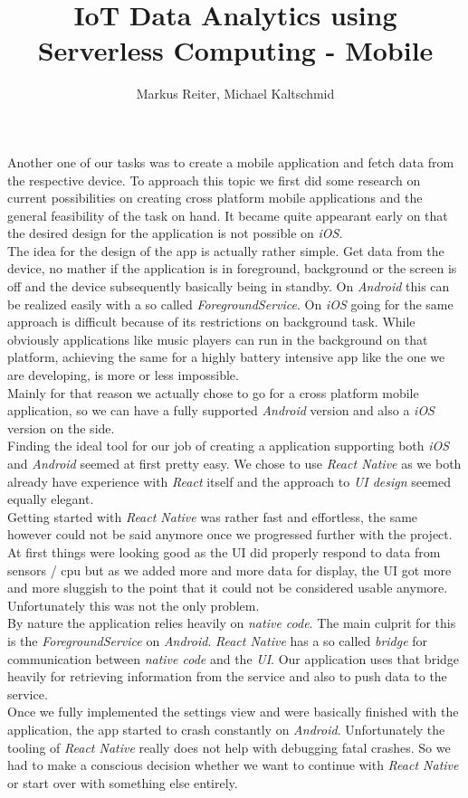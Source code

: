 \documentclass{article}
\title{IoT Data Analytics using Serverless Computing - Mobile}
\author{Markus Reiter, Michael Kaltschmid}
\date{}
\begin{document}
  \maketitle
  Another one of our tasks was to create a mobile application and fetch data from the respective device. To approach this topic we first did some research on current possibilities on creating cross platform mobile applications and the general feasibility of the task on hand. It became quite appearant early on that the desired design for the application is not possible on \textit{iOS}. \\
  The idea for the design of the app is actually rather simple. Get data from the device, no mather if the application is in foreground, background or the screen is off and the device subsequently basically being in standby.
  On \textit{Android} this can be realized easily with a so called \textit{ForegroundService}. On \textit{iOS} going for the same approach is difficult because of its restrictions on background task. While obviously applications like music players can run in the background on that platform, achieving the same for a highly battery intensive app like the one we are developing, is more or less impossible. \\
  Mainly for that reason we actually chose to go for a cross platform mobile application, so we can have a fully supported \textit{Android} version and also a \textit{iOS} version on the side. \\
  Finding the ideal tool for our job of creating a application supporting both \textit{iOS} and \textit{Android} seemed at first pretty easy. We chose to use \textit{React Native} as we both already have experience with \textit{React} itself and the approach to \textit{UI design} seemed equally elegant. \\
  Getting started with \textit{React Native} was rather fast and effortless, the same however could not be said anymore once we progressed further with the project. At first things were looking good as the UI did properly respond to data from sensors / cpu but as we added more and more data for display, the UI got more and more sluggish to the point that it could not be considered usable anymore. Unfortunately this was not the only problem. \\
  By nature the application relies heavily on \textit{native code}. The main culprit for this is the \textit{ForegroundService} on \textit{Android}. \textit{React Native} has a so called \textit{bridge} for communication between \textit{native code} and the \textit{UI}. Our application uses that bridge heavily for retrieving information from the service and also to push data to the service. \\
  Once we fully implemented the settings view and were basically finished with the application, the app started to crash constantly on \textit{Android}. Unfortunately the tooling of \textit{React Native} really does not help with debugging fatal crashes. So we had to make a conscious decision whether we want to continue with \textit{React Native} or start over with something else entirely.
\end{document}
